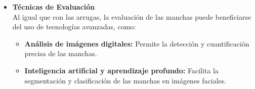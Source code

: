 \begin{itemize}
\item \textbf{Técnicas de Evaluación}\\
Al igual que con las arrugas, la evaluación de las manchas puede beneficiarse del uso de tecnologías avanzadas, como:
\begin{itemize} 
\item \textbf{Análisis de imágenes digitales:} Permite la detección y cuantificación precisa de las manchas. \parencite{gupta2023skin}
\item \textbf{Inteligencia artificial y aprendizaje profundo:} Facilita la segmentación y clasificación de las manchas en imágenes faciales. \parencite{gupta2023skin}
\end{itemize}
\end{itemize}




